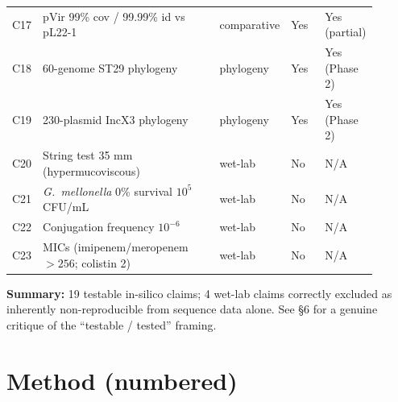 \documentclass[11pt,letterpaper]{article}
\begin{document}
\begin{longtable}{@{}p{0.05\linewidth} p{0.55\linewidth} p{0.10\linewidth} p{0.10\linewidth} p{0.10\linewidth}@{}}
C17 & pVir 99\% cov / 99.99\% id vs pL22-1 & comparative & Yes & Yes (partial) \\
C18 & 60-genome ST29 phylogeny & phylogeny & Yes & Yes (Phase 2) \\
C19 & 230-plasmid IncX3 phylogeny & phylogeny & Yes & Yes (Phase 2) \\
C20 & String test 35 mm (hypermucoviscous) & wet-lab & No & N/A \\
C21 & \textit{G.\ mellonella} 0\% survival $10^5$ CFU/mL & wet-lab & No & N/A \\
C22 & Conjugation frequency $10^{-6}$ & wet-lab & No & N/A \\
C23 & MICs (imipenem/meropenem $>256$; colistin 2) & wet-lab & No & N/A \\
\bottomrule
\end{longtable}

\textbf{Summary:} 19 testable in-silico claims; 4 wet-lab claims correctly excluded as inherently non-reproducible from sequence data alone. See \S6 for a genuine critique of the ``testable / tested'' framing.

\section{Method (numbered)}
\end{document}
